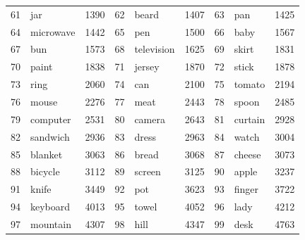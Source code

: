 \documentclass[12pt,a4paper]{report}
\begin{document}
\begin{table}[]
\begin{tabular}{lllllllll}
61 & jar        & 1390 & 62 & beard      & 1407 & 63 & pan        & 1425 \\
64 & microwave  & 1442 & 65 & pen        & 1500 & 66 & baby       & 1567 \\
67 & bun        & 1573 & 68 & television & 1625 & 69 & skirt      & 1831 \\
70 & paint      & 1838 & 71 & jersey     & 1870 & 72 & stick      & 1878 \\
73 & ring       & 2060 & 74 & can        & 2100 & 75 & tomato     & 2194 \\
76 & mouse      & 2276 & 77 & meat       & 2443 & 78 & spoon      & 2485 \\
79 & computer   & 2531 & 80 & camera     & 2643 & 81 & curtain    & 2928 \\
82 & sandwich   & 2936 & 83 & dress      & 2963 & 84 & watch      & 3004 \\
85 & blanket    & 3063 & 86 & bread      & 3068 & 87 & cheese     & 3073 \\
88 & bicycle    & 3112 & 89 & screen     & 3125 & 90 & apple      & 3237 \\
91 & knife      & 3449 & 92 & pot        & 3623 & 93 & finger     & 3722 \\
94 & keyboard   & 4013 & 95 & towel      & 4052 & 96 & lady       & 4212 \\
97 & mountain   & 4307 & 98 & hill       & 4347 & 99 & desk       & 4763
\end{tabular}
\end{table}
\newpage
\end{document}
